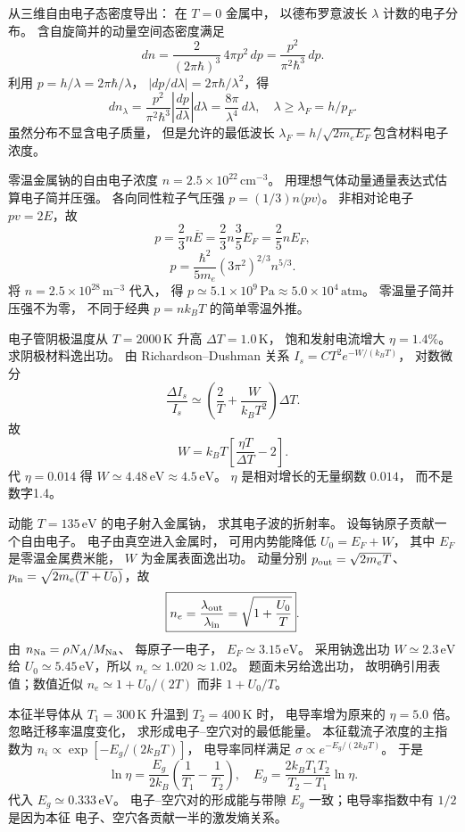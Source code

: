从三维自由电子态密度导出：
在 $T=0$ 金属中，
以德布罗意波长 $\lambda$ 计数的电子分布。
\exsolution
含自旋简并的动量空间态密度满足
\[
 dn=\frac{2}{(2\pi\hbar)^3}\,4\pi p^2\,dp
 =\frac{p^2}{\pi^2\hbar^3}\,dp.
\]
利用 $p=h/\lambda=2\pi\hbar/\lambda$，
$|dp/d\lambda|=2\pi\hbar/\lambda^2$，得
\[
 \boxed{dn_\lambda=
 \frac{p^2}{\pi^2\hbar^3}
 \left|\frac{dp}{d\lambda}\right|d\lambda
 =\frac{8\pi}{\lambda^4}\,d\lambda},
 \quad \lambda\ge\lambda_F=h/p_F.
\]
\excheck 虽然分布不显含电子质量，
但是允许的最低波长
$\lambda_F=h/\sqrt{2m_eE_F}$包含材料电子浓度。

零温金属钠的自由电子浓度
$n=2.5\times10^{22}\,\mathrm{cm^{-3}}$。
用理想气体动量通量表达式估算电子简并压强。
\exsolution
各向同性粒子气压强
$p=(1/3)n\langle pv\rangle$。
非相对论电子 $pv=2E$，故
\[
 p=\frac23n\overline E
 =\frac23n\frac35E_F=\frac25nE_F,
\]
\[
 \boxed{p=\frac{\hbar^2}{5m_e}(3\pi^2)^{2/3}n^{5/3}}.
\]
将 $n=2.5\times10^{28}\,\mathrm{m^{-3}}$ 代入，
得
$\boxed{p\simeq5.1\times10^9\,\mathrm{Pa}
 \approx5.0\times10^4\,\mathrm{atm}}$。
\excheck 零温量子简并压强不为零，
不同于经典 $p=nk_BT$ 的简单零温外推。

电子管阴极温度从 $T=2000\,\mathrm K$
升高 $\Delta T=1.0\,\mathrm K$，
饱和发射电流增大 $\eta=1.4\%$。
求阴极材料逸出功。
\exsolution
由 Richardson--Dushman 关系
$I_s=C T^2e^{-W/(k_BT)}$，
对数微分
\[
 \frac{\Delta I_s}{I_s}\simeq
 \left(\frac2T+\frac W{k_BT^2}\right)\Delta T.
\]
故
\[
 \boxed{W=k_BT\left[
 \frac{\eta T}{\Delta T}-2\right]}.
\]
代 $\eta=0.014$ 得
$\boxed{W\simeq4.48\,\mathrm{eV}\approx4.5\,\mathrm{eV}}$。
\excheck $\eta$ 是相对增长的无量纲数 $0.014$，
而不是数字1.4。

动能 $T=135\,\mathrm{eV}$ 的电子射入金属钠，
求其电子波的折射率。
设每钠原子贡献一个自由电子。
\exsolution
电子由真空进入金属时，
可用内势能降低 $U_0=E_F+W$，
其中 $E_F$ 是零温金属费米能，
$W$ 为金属表面逸出功。
动量分别
$p_{\rm out}=\sqrt{2m_eT}$、
$p_{\rm in}=\sqrt{2m_e(T+U_0)}$，故
\[
 \boxed{n_e=\frac{\lambda_{\rm out}}{\lambda_{\rm in}}
 =\sqrt{1+\frac{U_0}{T}}}.
\]
由 $n_{\rm Na}=\rho N_A/M_{\rm Na}$、
每原子一电子，
$E_F\simeq3.15\,\mathrm{eV}$。
采用钠逸出功 $W\simeq2.3\,\mathrm{eV}$
给 $U_0\simeq5.45\,\mathrm{eV}$，所以
$\boxed{n_e\simeq1.020\approx1.02}$。
\excheck 题面未另给逸出功，
故明确引用表值；数值近似
$n_e\simeq1+U_0/(2T)$ 而非 $1+U_0/T$。

本征半导体从 $T_1=300\,\mathrm K$
升温到 $T_2=400\,\mathrm K$ 时，
电导率增为原来的 $\eta=5.0$ 倍。
忽略迁移率温度变化，
求形成电子--空穴对的最低能量。
\exsolution
本征载流子浓度的主指数为
$n_i\propto\exp[-E_g/(2k_BT)]$，
电导率同样满足
$\sigma\propto e^{-E_g/(2k_BT)}$。
于是
\[
 \ln\eta=\frac{E_g}{2k_B}
 \left(\frac1{T_1}-\frac1{T_2}\right),
\quad
 \boxed{E_g=\frac{2k_BT_1T_2}{T_2-T_1}\ln\eta}.
\]
代入
$\boxed{E_g\simeq0.333\,\mathrm{eV}}$。
\excheck 电子--空穴对的形成能与带隙 $E_g$
一致；电导率指数中有 $1/2$ 是因为本征
电子、空穴各贡献一半的激发熵关系。

